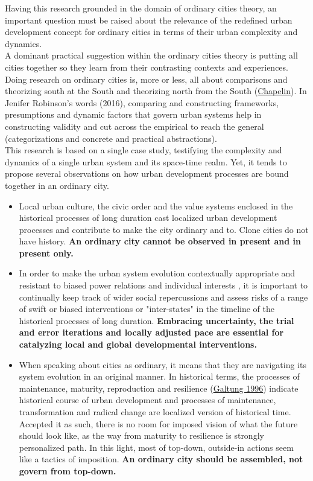 \documentclass[11pt]{report}
\begin{document}
{Having this research grounded in the domain of ordinary cities theory, an important question must be raised about the relevance of the redefined urban development concept for ordinary cities in terms of their urban complexity and dynamics.
\\
A dominant practical suggestion within the ordinary cities theory is putting all cities together so they learn from their contrasting contexts and experiences. Doing research on ordinary cities is, more or less, all about comparisons and theorizing south at the South   and theorizing north from the South (\href{}{Chapelin}).
In Jenifer Robinson's words (2016), comparing and constructing frameworks, presumptions and dynamic factors that govern urban systems help in constructing validity and cut across the empirical to reach the general (categorizations and concrete and practical abstractions).
\\
This research is based on a single case study, testifying the complexity and dynamics of a single urban system and its space-time realm.
Yet, it tends to propose several observations on how urban development processes are bound together in an ordinary city.

\begin{itemize}
\item
Local urban culture, the civic order and the value systems enclosed in the historical processes of long duration cast localized urban development processes and contribute to make the city ordinary and to.
Clone cities do not have history.
\textbf{An ordinary city cannot be observed in present and in present only.}

\item 
In order to make the urban system evolution contextually appropriate  and resistant to biased power relations and individual interests , it is important to continually keep track of wider social repercussions and assess risks of a range of swift or biased interventions or
"inter-states" in the timeline of the historical processes of long duration.
\textbf{Embracing uncertainty, the trial and error iterations and locally adjusted pace are essential for catalyzing local and global developmental interventions.}

\item
When speaking about cities as ordinary, it means that they are navigating its system evolution in an original manner.
In historical terms, the processes of maintenance, maturity, reproduction and resilience (\href{}{Galtung 1996}) indicate historical course of urban development and processes of maintenance, transformation and radical change  are localized version of historical time.
Accepted it as such, there is no room for imposed vision of what the future should look like, as the way from maturity to resilience is strongly personalized path. 
In this light, most of top-down, outside-in actions seem like a tactics of imposition. \textbf{An ordinary city should be assembled, not govern from top-down.}


\end{itemize}}
\end{document}
